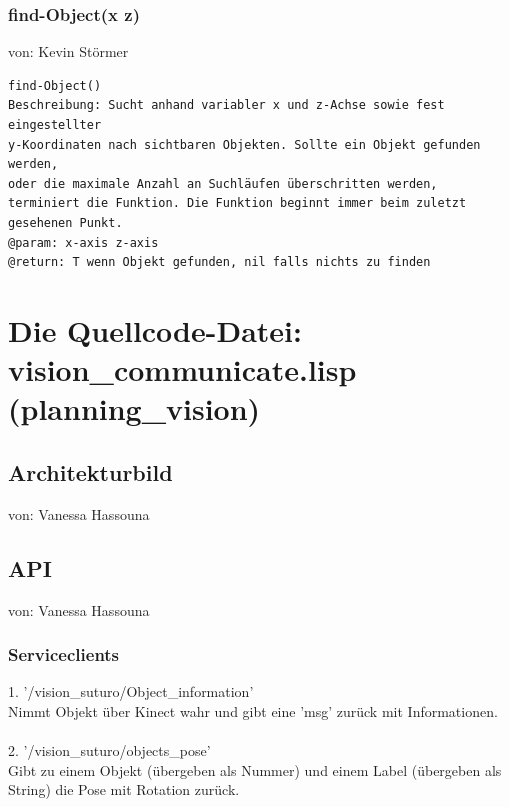 \documentclass{suturo}
\makeatletter
\newcommand{\chapterauthor}[1]{%
  {\parindent0pt\vspace*{-27pt}%
  \linespread{0}\small\begin{flushright}von: #1\end{flushright}%
  \par\nobreak\vspace*{0pt}}
  \@afterheading%
}
\makeatother
\begin{document}
\subsubsection{find-Object(x z)}
\chapterauthor{Kevin Störmer}
\begin{verbatim}
find-Object()
Beschreibung: Sucht anhand variabler x und z-Achse sowie fest eingestellter
y-Koordinaten nach sichtbaren Objekten. Sollte ein Objekt gefunden werden,
oder die maximale Anzahl an Suchläufen überschritten werden,
terminiert die Funktion. Die Funktion beginnt immer beim zuletzt gesehenen Punkt.
@param: x-axis z-axis
@return: T wenn Objekt gefunden, nil falls nichts zu finden
\end{verbatim}




\newpage
\section{Die Quellcode-Datei: vision\_communicate.lisp (planning\_vision)}

\subsection{Architekturbild}

\chapterauthor{Vanessa Hassouna}



\begin{figure}[!htb]
\end{figure}




\subsection{API}
\chapterauthor{Vanessa Hassouna}
\subsubsection{Serviceclients}
1. '/vision\_suturo/Object\_information' \\
Nimmt Objekt über Kinect wahr und gibt eine 'msg' zurück mit Informationen.\\ \\
2. '/vision\_suturo/objects\_pose' \\
Gibt zu einem Objekt (übergeben als Nummer) und einem Label (übergeben als String) die Pose mit Rotation zurück.
\end{document}
